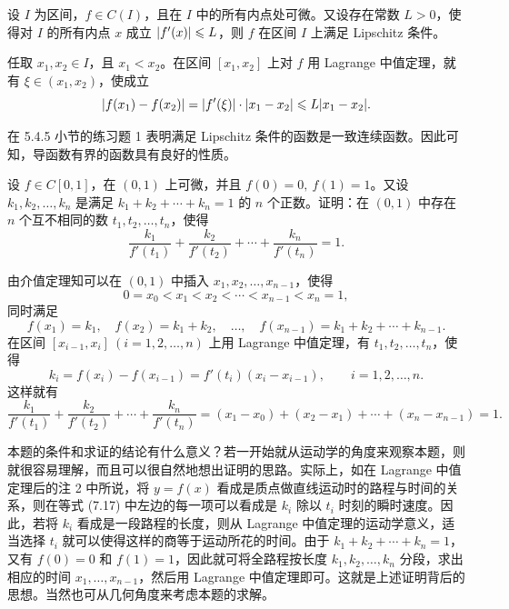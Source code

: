 \begin{xexample}[7.1.7]
设 $I$ 为区间，$f\in C(I)$，且在 $I$ 中的所有内点处可微。又设存在常数 $L>0$，使得对 $I$ 的所有内点 $x$ 成立 $\lvert f'(x)\rvert\leqslant L$，则 $f$ 在区间 $I$ 上满足 Lipschitz 条件。
\end{xexample}
\begin{xproof}
任取 $x_1,x_2\in I$，且 $x_1<x_2$。在区间 $[x_1,x_2]$ 上对 $f$ 用 Lagrange 中值定理，就有 $\xi\in(x_1,x_2)$，使成立
\[
  \lvert f(x_1)-f(x_2)\rvert=\lvert f'(\xi)\rvert\cdot\lvert x_1-x_2\rvert\leqslant L\lvert x_1-x_2\rvert.
\]
\end{xproof}

\begin{xremark}
在 5.4.5 小节的练习题 1 表明满足 Lipschitz 条件的函数是一致连续函数。因此可知，导函数有界的函数具有良好的性质。
\end{xremark}

\begin{xexample}[7.1.8]
设 $f\in C[0,1]$，在 $(0,1)$ 上可微，并且 $f(0)=0,\ f(1)=1$。又设 $k_1,k_2,\ldots,k_n$ 是满足 $k_1+k_2+\cdots+k_n=1$ 的 $n$ 个正数。证明：在 $(0,1)$ 中存在 $n$ 个互不相同的数 $t_1,t_2,\ldots,t_n$，使得
\begin{equation}
  \frac{k_1}{f'(t_1)}+\frac{k_2}{f'(t_2)}+\cdots+\frac{k_n}{f'(t_n)}=1.
  \tag{7.17}
\end{equation}
\end{xexample}
\begin{xproof}
由介值定理知可以在 $(0,1)$ 中插入 $x_1,x_2,\ldots,x_{n-1}$，使得
\[
  0=x_0<x_1<x_2<\cdots<x_{n-1}<x_n=1,
\]
同时满足
\[
  f(x_1)=k_1,\quad f(x_2)=k_1+k_2,\quad\ldots,\quad f(x_{n-1})=k_1+k_2+\cdots+k_{n-1}.
\]
在区间 $[x_{i-1},x_i]\ (i=1,2,\ldots,n)$ 上用 Lagrange 中值定理，有 $t_1,t_2,\ldots,t_n$，使得
\[
  k_i=f(x_i)-f(x_{i-1})=f'(t_i)(x_i-x_{i-1}),\qquad i=1,2,\ldots,n.
\]
这样就有
\[
  \frac{k_1}{f'(t_1)}+\frac{k_2}{f'(t_2)}+\cdots+\frac{k_n}{f'(t_n)}
  =(x_1-x_0)+(x_2-x_1)+\cdots+(x_n-x_{n-1})=1.
\]
\end{xproof}

\begin{xremark}
本题的条件和求证的结论有什么意义？若一开始就从运动学的角度来观察本题，则就很容易理解，而且可以很自然地想出证明的思路。实际上，如在 Lagrange 中值定理后的注 2 中所说，将 $y=f(x)$ 看成是质点做直线运动时的路程与时间的关系，则在等式 (7.17) 中左边的每一项可以看成是 $k_i$ 除以 $t_i$ 时刻的瞬时速度。因此，若将 $k_i$ 看成是一段路程的长度，则从 Lagrange 中值定理的运动学意义，适当选择 $t_i$ 就可以使得这样的商等于运动所花的时间。由于 $k_1+k_2+\cdots+k_n=1$，又有 $f(0)=0$ 和 $f(1)=1$，因此就可将全路程按长度 $k_1,k_2,\ldots,k_n$ 分段，求出相应的时间 $x_1,\ldots,x_{n-1}$，然后用 Lagrange 中值定理即可。这就是上述证明背后的思想。当然也可从几何角度来考虑本题的求解。
\end{xremark}

